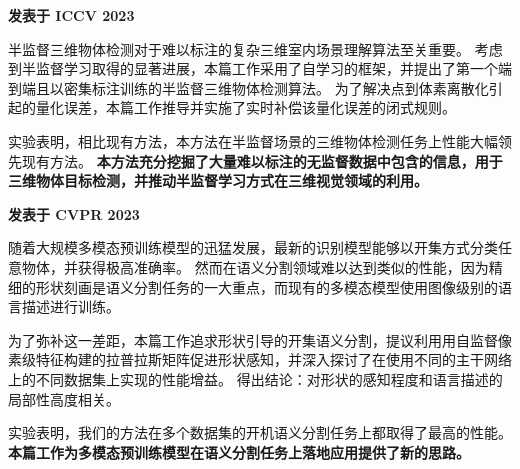 \documentclass{resume}
\begin{document}
\begin{spacing}{1.2}
  \textbf{发表于 ICCV 2023}
  
  \vspace{0.5em}
  半监督三维物体检测对于难以标注的复杂三维室内场景理解算法至关重要。
  考虑到半监督学习取得的显著进展，本篇工作采用了自学习的框架，并提出了第一个端到端且以密集标注训练的半监督三维物体检测算法。
  为了解决点到体素离散化引起的量化误差，本篇工作推导并实施了实时补偿该量化误差的闭式规则。
  
  \vspace{0.5em}
  实验表明，相比现有方法，本方法在半监督场景的三维物体检测任务上性能大幅领先现有方法。
  \textbf{本方法充分挖掘了大量难以标注的无监督数据中包含的信息，用于三维物体目标检测，并推动半监督学习方式在三维视觉领域的利用。}
\end{spacing}

\begin{spacing}{1.2}
  \textbf{发表于 CVPR 2023}
  
  \vspace{0.5em}
  随着大规模多模态预训练模型的迅猛发展，最新的识别模型能够以开集方式分类任意物体，并获得极高准确率。
  然而在语义分割领域难以达到类似的性能，因为精细的形状刻画是语义分割任务的一大重点，而现有的多模态模型使用图像级别的语言描述进行训练。
  
  \vspace{0.5em}
  为了弥补这一差距，本篇工作追求形状引导的开集语义分割，提议利用用自监督像素级特征构建的拉普拉斯矩阵促进形状感知，并深入探讨了在使用不同的主干网络上的不同数据集上实现的性能增益。
  得出结论：对形状的感知程度和语言描述的局部性高度相关。
  
  \vspace{0.5em}
  实验表明，我们的方法在多个数据集的开机语义分割任务上都取得了最高的性能。
  \textbf{本篇工作为多模态预训练模型在语义分割任务上落地应用提供了新的思路。}
\end{spacing}
\end{document}
